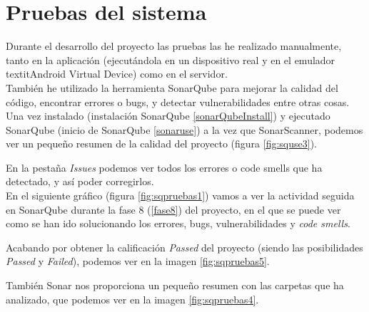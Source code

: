 \section{Pruebas del sistema}

Durante el desarrollo del proyecto las pruebas las he realizado manualmente, tanto en la aplicación (ejecutándola en un dispositivo real y en el emulador textit{Android Virtual Device}) como en el servidor.\\

También he utilizado la herramienta SonarQube para mejorar la calidad del código, encontrar errores o bugs, y detectar vulnerabilidades entre otras cosas.  Una vez instalado (instalación SonarQube \ref{sonarQubeInstall}) y ejecutado SonarQube (inicio de SonarQube \ref{sonaruse}) a la vez que SonarScanner, podemos ver un pequeño resumen de la calidad del proyecto (figura \ref{fig:squse3}).


En la pestaña \textit{Issues} podemos ver todos los errores o code smells que ha detectado, y así poder corregirlos.\\

En el siguiente gráfico (figura \ref{fig:sqpruebas1}) vamos a ver la actividad seguida en SonarQube durante la fase 8 (\ref{fase8}) del proyecto, en el que se puede ver como se han ido solucionando los errores, bugs, vulnerabilidades y \textit{code smells}.


Acabando por obtener la calificación \textit{Passed} del proyecto (siendo las posibilidades \textit{Passed} y \textit{Failed}), podemos ver en la imagen \ref{fig:sqpruebas5}.


También Sonar nos proporciona un pequeño resumen con las carpetas que ha analizado, que podemos ver en la imagen \ref{fig:sqpruebas4}.















